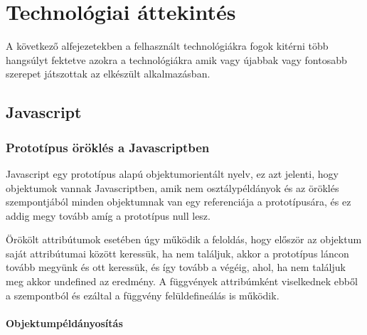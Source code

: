 



\chapter{Technológiai áttekintés}
A következő alfejezetekben a felhasznált technológiákra fogok kitérni több hangsúlyt fektetve azokra a technológiákra amik vagy újabbak vagy fontosabb szerepet játszottak az elkészült alkalmazásban.

\section{Javascript}

\subsection{Prototípus öröklés a Javascriptben}


Javascript egy prototípus alapú objektumorientált nyelv, ez azt jelenti, hogy objektumok vannak Javascriptben, amik nem osztálypéldányok és az öröklés szempontjából minden objektumnak van egy referenciája a prototípusára, és ez addig megy tovább amíg a prototípus null lesz. 

Örökölt attribútumok esetében úgy működik a feloldás, hogy először az objektum saját attribútumai között keressük, ha nem találjuk, akkor a prototípus láncon tovább megyünk és ott keressük, és így tovább a végéig, ahol, ha nem találjuk meg akkor undefined az eredmény. A függvények attribúmként viselkednek ebből a szempontból és ezáltal a függvény felüldefineálás is működik.

\subsubsection{Objektumpéldányosítás}

